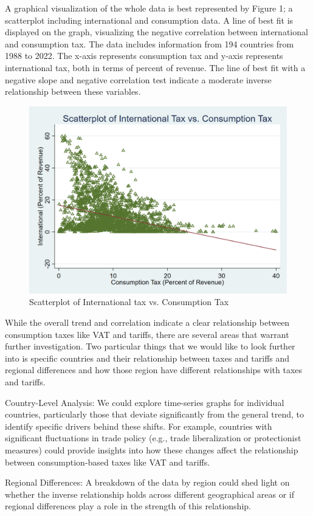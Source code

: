 \documentclass[12pt]{article}
\begin{document}
A graphical visualization of the whole data is best represented by Figure 1; a scatterplot including international and consumption data. A line of best fit is displayed on the graph, visualizing the negative correlation between international and consumption tax. The data includes information from 194 countries from 1988 to 2022. The x-axis represents consumption tax and y-axis represents international tax, both in terms of percent of revenue. The line of best fit with a negative slope and negative correlation test indicate a moderate inverse relationship between these variables. 

\begin{figure}[h]
    \centering
    \includegraphics[width=0.5\linewidth]{Reproducibility_Package//research_outputs/Scatterplotintvscons.png}
    \caption{Scatterplot of International tax vs. Consumption Tax}
    \label{fig:enter-label}
\end{figure}

While the overall trend and correlation indicate a clear relationship between consumption taxes like VAT and tariffs, there are several areas that warrant further investigation. Two particular things that we would like to look further into is specific countries and their relationship between taxes and tariffs and regional differences and how those region have different relationships with taxes and tariffs.

Country-Level Analysis: We could explore time-series graphs for individual countries, particularly those that deviate significantly from the general trend, to identify specific drivers behind these shifts. For example, countries with significant fluctuations in trade policy (e.g., trade liberalization or protectionist measures) could provide insights into how these changes affect the relationship between consumption-based taxes like VAT and tariffs.

Regional Differences: A breakdown of the data by region could shed light on whether the inverse relationship holds across different geographical areas or if regional differences play a role in the strength of this relationship.
\end{document}
